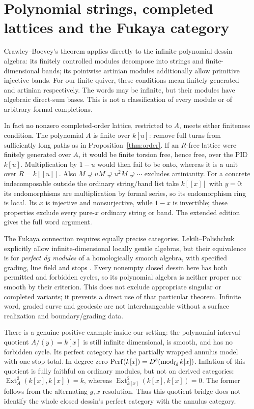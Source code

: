 \documentclass[11pt,oneside,openany]{book}
\theoremstyle{definition}\newtheorem{definition}[theorem]{Definition}
\theoremstyle{remark}\newtheorem{remark}[theorem]{Remark}
\begin{document}
\section{Polynomial strings, completed lattices and the Fukaya category}
Crawley--Boevey's theorem \cite[Theorems1.1--1.4]{CrawleyBoeveyStrings} applies directly to the infinite polynomial dessin algebra: its finitely controlled modules decompose into strings and finite-dimensional bands; its pointwise artinian modules additionally allow primitive injective bands. For our finite quiver, these conditions mean finitely generated and artinian respectively. The words may be infinite, but their modules have algebraic direct-sum bases. This is not a classification of every module or of arbitrary formal completions.

In fact no nonzero completed-order lattice, restricted to $A$, meets either finiteness condition. The polynomial $A$ is finite over $k[u]$: remove full turns from sufficiently long paths as in Proposition~\ref{thm:order}. If an $R$-free lattice were finitely generated over $A$, it would be finite torsion free, hence free, over the PID $k[u]$. Multiplication by $1-u$ would then fail to be onto, whereas it is a unit over $R=k[[u]]$. Also $M\supsetneq uM\supsetneq u^2M\supsetneq\cdots$ excludes artinianity. For a concrete indecomposable outside the ordinary string/band list take $k[[x]]$ with $y=0$: its endomorphisms are multiplication by formal series, so its endomorphism ring is local. Its $x$ is injective and nonsurjective, while $1-x$ is invertible; these properties exclude every pure-$x$ ordinary string or band. The extended edition gives the full word argument.

The Fukaya connection requires equally precise categories. Lekili--Polishchuk explicitly allow infinite-dimensional locally gentle algebras, but their equivalence is for \emph{perfect dg modules} of a homologically smooth algebra, with specified grading, line field and stops \cite[Definition3.1.1, Lemma3.1.3, Theorem3.2.2]{LekiliPolishchuk}. Every nonempty closed dessin here has both permitted and forbidden cycles, so its polynomial algebra is neither proper nor smooth by their criterion. This does not exclude appropriate singular or completed variants; it prevents a direct use of that particular theorem. Infinite word, graded curve and geodesic are not interchangeable without a surface realization and boundary/grading data.

There is a genuine positive example inside our setting: the polynomial interval quotient $A/(y)=k[x]$ is still infinite dimensional, is smooth, and has no forbidden cycle. Its perfect category has the partially wrapped annulus model with one stop total. In degree zero $\operatorname{Perf}(k[x])=D^b(\operatorname{mod}_{\rm fg}k[x])$. Inflation of this quotient is fully faithful on ordinary modules, but not on derived categories: $\operatorname{Ext}_A^2(k[x],k[x])=k$, whereas $\operatorname{Ext}_{k[x]}^2(k[x],k[x])=0$. The former follows from the alternating $y,x$ resolution. Thus this quotient bridge does not identify the whole closed dessin's perfect category with the annulus category.
\end{document}

